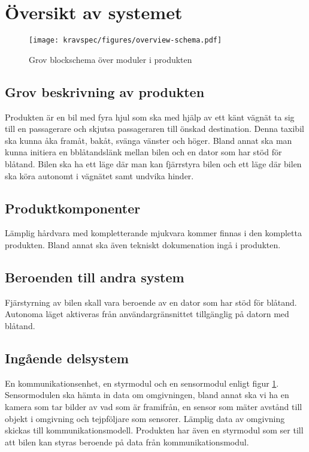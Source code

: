 \documentclass[kravspec/krav.tex]{subfiles}
\begin{document}
\section{Översikt av systemet}

\begin{figure}[h]
    \centering
    \texttt{[image: kravspec/figures/overview-schema.pdf]}
    \caption{Grov blockschema över moduler i produkten}
    \label{fig:overview}
\end{figure}

\subsection{Grov beskrivning av produkten}
Produkten är en bil med fyra hjul som ska med hjälp av ett känt vägnät ta sig
till en passagerare och skjutsa passageraren till önskad destination. Denna
taxibil ska kunna åka framåt, bakåt, svänga vänster och höger.  Bland annat ska
man kunna initiera en bblåtandslänk mellan bilen och en dator som har stöd för
blåtand. Bilen ska ha ett läge där man kan fjärrstyra bilen och ett läge där
bilen ska köra autonomt i vägnätet samt undvika hinder.

\subsection{Produktkomponenter}
Lämplig hårdvara med kompletterande mjukvara kommer finnas i den kompletta
produkten.  Bland annat ska även tekniskt dokumenation ingå i produkten.

\subsection{Beroenden till andra system}
Fjärstyrning av bilen skall vara beroende av en dator som har stöd för blåtand.
Autonoma läget aktiveras från användargränsnittet tillgänglig på datorn med
blåtand.

\subsection{Ingående delsystem}
En kommunikationsenhet, en styrmodul och en sensormodul enligt figur
\ref{fig:overview}. Sensormodulen ska hämta in data om omgivningen, bland annat
ska vi ha en kamera som tar bilder av vad som är framifrån, en sensor som mäter
avstånd till objekt i omgivning och tejpföljare som sensorer. Lämplig data av
omgivning skickas till kommunikationsmodell. Produkten har även en styrmodul
som ser till att bilen kan styras beroende på data från kommunikationsmodul.
\end{document}
